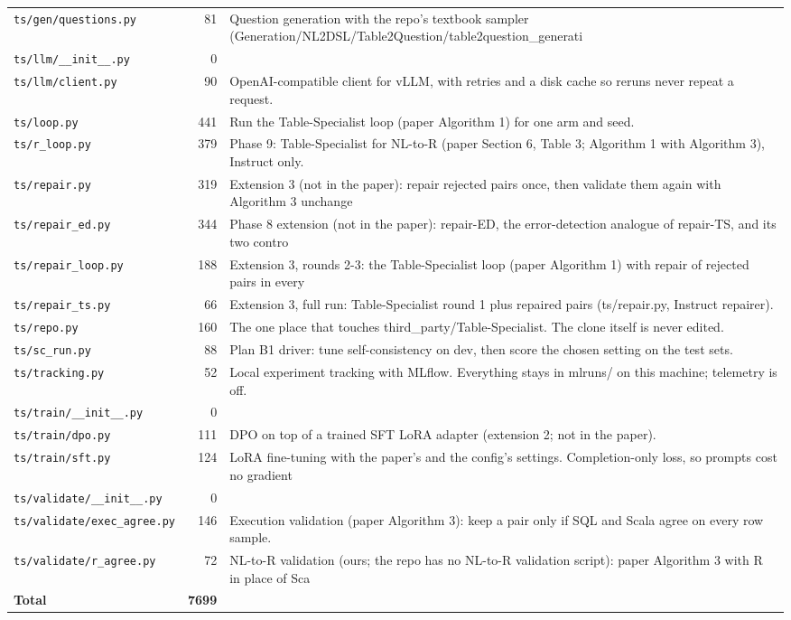 {\begin{longtable}{@{}p{4.6cm}rp{9.2cm}@{}}
\texttt{ts/gen/questions.py} & 81 & Question generation with the repo's textbook sampler (Generation/NL2DSL/Table2Question/table2question\_generati\\
\texttt{ts/llm/\_\_init\_\_.py} & 0 & \\
\texttt{ts/llm/client.py} & 90 & OpenAI-compatible client for vLLM, with retries and a disk cache so reruns never repeat a request.\\
\texttt{ts/loop.py} & 441 & Run the Table-Specialist loop (paper Algorithm 1) for one arm and seed.\\
\texttt{ts/r\_loop.py} & 379 & Phase 9: Table-Specialist for NL-to-R (paper Section 6, Table 3; Algorithm 1 with Algorithm 3), Instruct only.\\
\texttt{ts/repair.py} & 319 & Extension 3 (not in the paper): repair rejected pairs once, then validate them again with Algorithm 3 unchange\\
\texttt{ts/repair\_ed.py} & 344 & Phase 8 extension (not in the paper): repair-ED, the error-detection analogue of repair-TS, and its two contro\\
\texttt{ts/repair\_loop.py} & 188 & Extension 3, rounds 2-3: the Table-Specialist loop (paper Algorithm 1) with repair of rejected pairs in every \\
\texttt{ts/repair\_ts.py} & 66 & Extension 3, full run: Table-Specialist round 1 plus repaired pairs (ts/repair.py, Instruct repairer).\\
\texttt{ts/repo.py} & 160 & The one place that touches third\_party/Table-Specialist. The clone itself is never edited.\\
\texttt{ts/sc\_run.py} & 88 & Plan B1 driver: tune self-consistency on dev, then score the chosen setting on the test sets.\\
\texttt{ts/tracking.py} & 52 & Local experiment tracking with MLflow. Everything stays in mlruns/ on this machine; telemetry is off.\\
\texttt{ts/train/\_\_init\_\_.py} & 0 & \\
\texttt{ts/train/dpo.py} & 111 & DPO on top of a trained SFT LoRA adapter (extension 2; not in the paper).\\
\texttt{ts/train/sft.py} & 124 & LoRA fine-tuning with the paper's and the config's settings. Completion-only loss, so prompts cost no gradient\\
\texttt{ts/validate/\_\_init\_\_.py} & 0 & \\
\texttt{ts/validate/exec\_agree.py} & 146 & Execution validation (paper Algorithm 3): keep a pair only if SQL and Scala agree on every row sample.\\
\texttt{ts/validate/r\_agree.py} & 72 & NL-to-R validation (ours; the repo has no NL-to-R validation script): paper Algorithm 3 with R in place of Sca\\
\textbf{Total} & \textbf{7699} &\\
\end{longtable}
}
